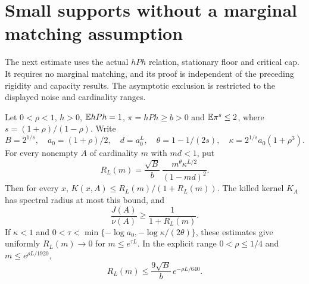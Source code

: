 \section{Small supports without a marginal matching assumption}
The next estimate uses the actual $hPh$ relation, stationary floor and critical cap. It requires no marginal matching, and its proof is independent of the preceding rigidity and capacity results. The asymptotic exclusion is restricted to the displayed noise and cardinality ranges.

\begin{theorem}\label{support346}
Let $0<\rho<1$, $h>0$, $\mathbb E hPh=1$, $\pi=hPh\geq b>0$ and $\mathbb E\pi^s\leq2$, where $s=(1+\rho)/(1-\rho)$. Write
\[
 B=2^{1/s},\quad a_0=(1+\rho)/2,\quad d=a_0^L,\quad
 \theta=1-1/(2s),\quad \kappa=2^{1/s}a_0(1+\rho^3).
\]
For every nonempty $A$ of cardinality $m$ with $md<1$, put
\[
 R_L(m)=\frac{\sqrt B}{b}\,
 \frac{m^\theta\kappa^{L/2}}{(1-md)^2}.
\]
Then for every $x$, $K(x,A)\leq R_L(m)/(1+R_L(m))$. The killed kernel $K_A$ has spectral radius at most this bound, and
\[
 \frac{J(A)}{\nu(A)}\geq\frac1{1+R_L(m)}.
\]
If $\kappa<1$ and $0<\tau<\min\{-\log a_0,-\log\kappa/(2\theta)\}$, these estimates give uniformly $R_L(m)\to0$ for $m\leq e^{\tau L}$. In the explicit range $0<\rho\leq1/4$ and $m\leq e^{\rho L/1920}$,
\[
 R_L(m)\leq\frac{9\sqrt B}{b}\,e^{-\rho L/640}.
\]
\end{theorem}
